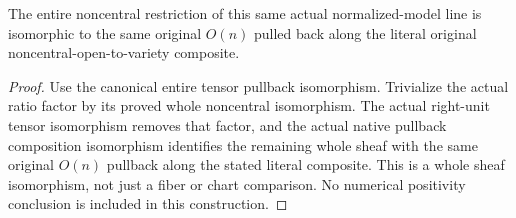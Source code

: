 \begin{theorem}
\label{thm:actual-normalized-pl-projective-twist-noncentral}
\leanok
{}
The entire noncentral restriction of this same actual normalized-model line
is isomorphic to the same original $O(n)$ pulled back along the literal
original noncentral-open-to-variety composite.
\end{theorem}
\begin{proof}
Use the canonical entire tensor pullback isomorphism. Trivialize the actual
ratio factor by its proved whole noncentral isomorphism. The actual right-unit
tensor isomorphism removes that factor, and the actual native pullback
composition isomorphism identifies the remaining whole sheaf with the same
original $O(n)$ pullback along the stated literal composite. This is a whole
sheaf isomorphism, not just a fiber or chart comparison. No numerical
positivity conclusion is included in this construction.
\end{proof}
